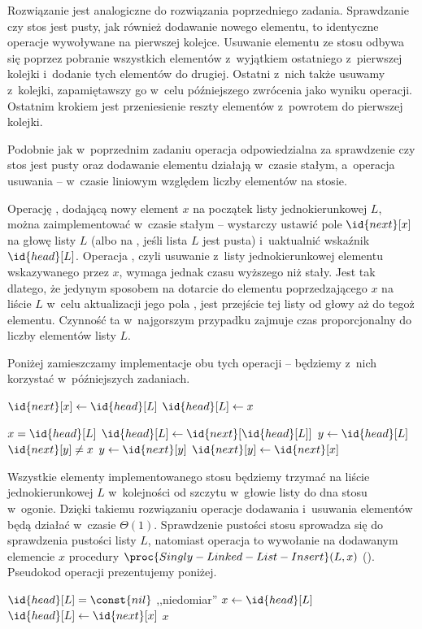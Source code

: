 \exercise %
Rozwiązanie jest analogiczne do rozwiązania poprzedniego zadania. Sprawdzanie czy stos jest pusty, jak również dodawanie nowego elementu, to identyczne operacje wywoływane na pierwszej kolejce. Usuwanie elementu ze stosu odbywa się poprzez pobranie wszystkich elementów z~wyjątkiem ostatniego z~pierwszej kolejki i~dodanie tych elementów do drugiej. Ostatni z~nich także usuwamy z~kolejki, zapamiętawszy go w~celu późniejszego zwrócenia jako wyniku operacji. Ostatnim krokiem jest przeniesienie reszty elementów z~powrotem do pierwszej kolejki.

Podobnie jak w~poprzednim zadaniu operacja odpowiedzialna za sprawdzenie czy stos jest pusty oraz dodawanie elementu działają w~czasie stałym, a~operacja usuwania -- w~czasie liniowym względem liczby elementów na stosie.


\exercise %
Operację , dodającą nowy element $x$ na początek listy jednokierunkowej $L$, można zaimplementować w~czasie stałym -- wystarczy ustawić pole $\id{next}[x]$ na głowę listy $L$ (albo na , jeśli lista $L$ jest pusta) i~uaktualnić wskaźnik $\id{head}[L]$. Operacja , czyli usuwanie z~listy jednokierunkowej elementu wskazywanego przez $x$, wymaga jednak czasu wyższego niż stały. Jest tak dlatego, że jedynym sposobem na dotarcie do elementu poprzedzającego $x$ na liście $L$ w~celu aktualizacji jego pola , jest przejście tej listy od głowy aż do tegoż elementu. Czynność ta w~najgorszym przypadku zajmuje czas proporcjonalny do liczby elementów listy $L$.

Poniżej zamieszczamy implementacje obu tych operacji -- będziemy z~nich korzystać w~późniejszych zadaniach.
\begin{codebox}
\li	$\id{next}[x]\gets\id{head}[L]$
\li	$\id{head}[L]\gets x$
\end{codebox}

\begin{codebox}
\li	\If $x=\id{head}[L]$
\li		\Then $\id{head}[L]\gets\id{next}[\id{head}[L]]$
\li		\Else
			$y\gets\id{head}[L]$
\li			\While $\id{next}[y]\ne x$
\li				\Do $y\gets\id{next}[y]$
				\End
\li			$\id{next}[y]\gets\id{next}[x]$
		\End
\end{codebox}

\exercise %
Wszystkie elementy implementowanego stosu będziemy trzymać na liście jednokierunkowej $L$ w~kolejności od szczytu w~głowie listy do dna stosu w~ogonie. Dzięki takiemu rozwiązaniu operacje dodawania i~usuwania elementów będą działać w~czasie $\Theta(1)$. Sprawdzenie pustości stosu sprowadza się do sprawdzenia pustości listy $L$, natomiast operacja  to wywołanie na dodawanym elemencie $x$ procedury $\proc{Singly-Linked-List-Insert}(L,x)$ (). Pseudokod operacji  prezentujemy poniżej.
\begin{codebox}
\li	\If $\id{head}[L]=\const{nil}$
\li		\Then \Error ,,niedomiar''
		\End
\li	$x\gets\id{head}[L]$
\li	$\id{head}[L]\gets\id{next}[x]$
\li	\Return $x$
\end{codebox}

